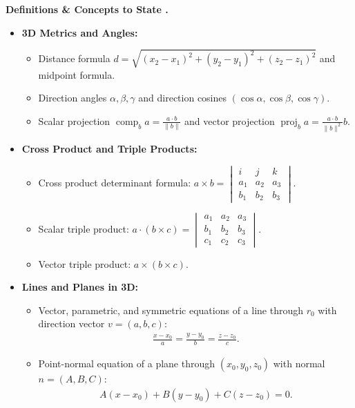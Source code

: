 \documentclass{natsirt}
\newcounter{topic}[section]
\newenvironment{recallbox}[1][]{%
    \begin{bluebox}[#1]\refstepcounter{topic}\textbf{Definitions \& Concepts to State \thesection.\thetopic}%
}{\end{bluebox}}
\newcommand{\citem}{\item[$\square$]}
\newcommand{\comp}{\operatorname{comp}}
\newcommand{\proj}{\operatorname{proj}}
\begin{document}
\begin{recallbox}
    \begin{itemize}
        \citem \textbf{3D Metrics and Angles:}
        \begin{itemize}
            \item Distance formula $d = \sqrt{(x_2-x_1)^2 + (y_2-y_1)^2 + (z_2-z_1)^2}$ and midpoint formula.
            \item Direction angles $\alpha, \beta, \gamma$ and direction cosines $(\cos\alpha, \cos\beta, \cos\gamma)$.
            \item Scalar projection $\comp_b a = \frac{a \cdot b}{\|b\|}$ and vector projection $\proj_b a = \frac{a \cdot b}{\|b\|^2} b$.
        \end{itemize}
        \citem \textbf{Cross Product and Triple Products:}
        \begin{itemize}
            \item Cross product determinant formula: $a \times b = \begin{vmatrix} i & j & k \\ a_1 & a_2 & a_3 \\ b_1 & b_2 & b_3 \end{vmatrix}$.
            \item Scalar triple product: $a \cdot (b \times c) = \begin{vmatrix} a_1 & a_2 & a_3 \\ b_1 & b_2 & b_3 \\ c_1 & c_2 & c_3 \end{vmatrix}$.
            \item Vector triple product: $a \times (b \times c)$.
        \end{itemize}
        \citem \textbf{Lines and Planes in 3D:}
        \begin{itemize}
            \item Vector, parametric, and symmetric equations of a line through $r_0$ with direction vector $v = (a, b, c)$:
            \begin{align*}
                \frac{x - x_0}{a} = \frac{y - y_0}{b} = \frac{z - z_0}{c}.
            \end{align*}
            \item Point-normal equation of a plane through $(x_0, y_0, z_0)$ with normal $n = (A, B, C)$:
            \begin{align*}
                A(x - x_0) + B(y - y_0) + C(z - z_0) = 0.
            \end{align*}
        \end{itemize}

\end{itemize}
\end{recallbox}
\end{document}
